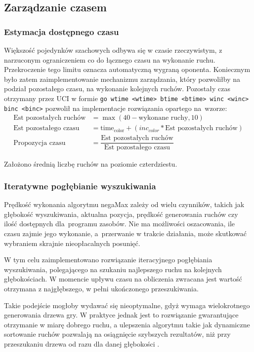\subsection{Zarządzanie czasem}
\label{subsec:zarzadzanie-czasem}
\subsubsection{Estymacja dostępnego czasu}
Większość pojedynków szachowych odbywa się w czasie rzeczywistym, z narzuconym ograniczeniem co do łącznego czasu na wykonanie ruchu.
Przekroczenie tego limitu oznacza automatyczną wygraną oponenta.
Koniecznym było zatem zaimplementowanie mechanizmu zarządzania, który pozwoliłby na podział pozostałego czasu, na wykonanie kolejnych ruchów.
Pozostały czas otrzymany przez UCI w formie \texttt{go wtime <wtime> btime <btime> winc <winc> binc <binc>} pozwolił na implementacje rozwiązania opartego na~wzorze:
\begin{align*}
    \text{Est pozostałych ruchów} &= {\max(40 - \text{wykonane ruchy}, 10)} \\
    \text{Est pozostałego czasu} &= \mathrm{time_{color}} + (inc_{color} * \text{Est pozostałych ruchów}) \\
    \text{Propozycja czasu} &= \dfrac{\text{Est pozostałych ruchów}}{\text{Est pozostałego czasu}}
\end{align*}

Założono średnią liczbę ruchów na poziomie czterdziestu.

\subsubsection{Iteratywne pogłębianie wyszukiwania}
Prędkość wykonania algorytmu negaMax zależy od wielu czynników, takich jak głębokość wyszukiwania, aktualna pozycja, prędkość generowania ruchów czy ilość dostępnych dla~programu zasobów.
Nie ma możliwości oszacowania, ile czasu zajmie jego wykonanie, a~przerwanie w trakcie działania, może skutkować wybraniem skrajnie nieopłacalnych posunięć.

W tym celu zaimplementowano rozwiązanie iteracyjnego pogłębiania wyszukiwania, polegającego na szukaniu najlepszego ruchu na kolejnych głębokościach.
W momencie upływu czasu na obliczenia zwracana jest wartość otrzymana z najgłębszego, w pełni ukończonego przeszukiwania.

Takie podejście mogłoby wydawać się nieoptymalne, gdyż wymaga wielokrotnego generowania drzewa gry.
W praktyce jednak jest to rozwiązanie gwarantujące otrzymanie w miarę dobrego ruchu, a ulepszenia algorytmu takie jak dynamiczne sortowanie ruchów pozwalają na osiągnięcie szybszych rezultatów, niż przy przeszukaniu drzewa od razu dla danej głębokości \cite*{wiki-deepening}.